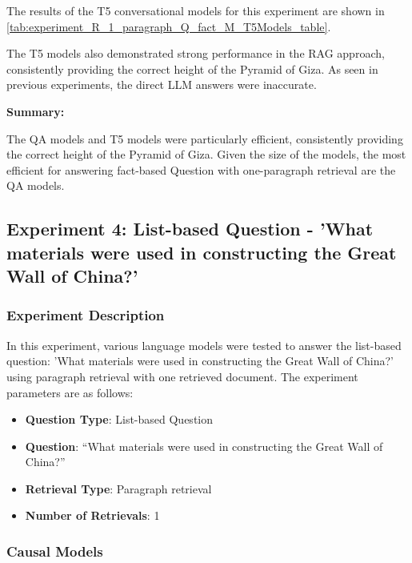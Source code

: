 \documentclass{wseas}
\begin{document}
The results of the T5 conversational models for this experiment
are shown in \autoref{tab:experiment_R_1_paragraph_Q_fact_M_T5Models_table}.

The T5 models also demonstrated strong performance in the RAG approach,
consistently providing the correct height of the Pyramid of Giza. As
seen in previous experiments, the direct LLM answers were inaccurate.

\textbf{Summary:}

The QA models and T5 models were particularly efficient, consistently
providing the correct height of the Pyramid of Giza. Given the size of
the models, the most efficient for answering fact-based Question with
one-paragraph retrieval are the QA models.

\subsection{Experiment 4: List-based Question - 'What materials were
used in constructing the Great Wall of China?'}

\subsubsection{Experiment Description}

In this experiment, various language models were tested to answer the
list-based question: 'What materials were used in constructing the
Great Wall of China?' using paragraph retrieval with one retrieved
document. The experiment parameters are as follows:

\begin{itemize}

\item
  \textbf{Question Type}: List-based Question
\item
  \textbf{Question}: ``What materials were used in constructing the
  Great Wall of China?''
\item
  \textbf{Retrieval Type}: Paragraph retrieval
\item
  \textbf{Number of Retrievals}: 1
\end{itemize}

\subsubsection{Causal Models}
\end{document}
